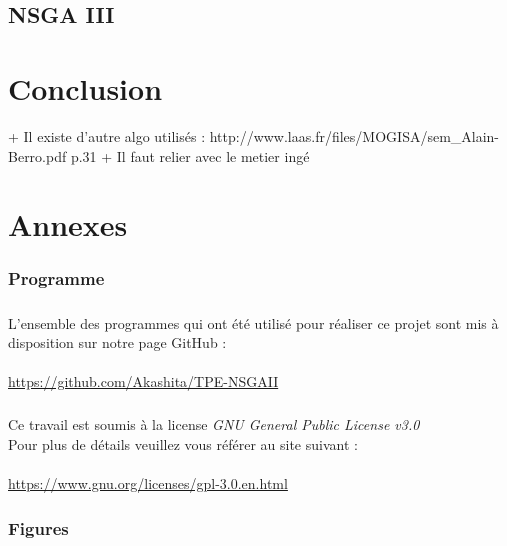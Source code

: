 \documentclass[12pt]{report}
\begin{document}
    \section{NSGA III}


  \chapter{Conclusion}
   + Il existe d'autre algo utilisés : http://www.laas.fr/files/MOGISA/sem_Alain-Berro.pdf p.31
   + Il faut relier avec le metier ingé
  \appendix

  \nocite{*} %
  
  

  \chapter{Annexes}
    \subsection{Programme}
      \paragraph{}
      L'ensemble des programmes qui ont été utilisé pour réaliser ce projet sont mis à disposition sur notre page GitHub : \\\\
      \url{https://github.com/Akashita/TPE-NSGAII}

      \paragraph{}
      Ce travail est soumis à la license \emph{GNU General Public License v3.0}\\ %
      Pour plus de détails veuillez vous référer au site suivant : \\\\
      \url{https://www.gnu.org/licenses/gpl-3.0.en.html}

    \subsection{Figures}
\end{document}
